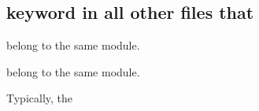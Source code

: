 \hypertarget{a00060}{}\subsection{keyword in all other files that}
\label{a00060}


belong to the same module.  


belong to the same module. 

Typically, the 